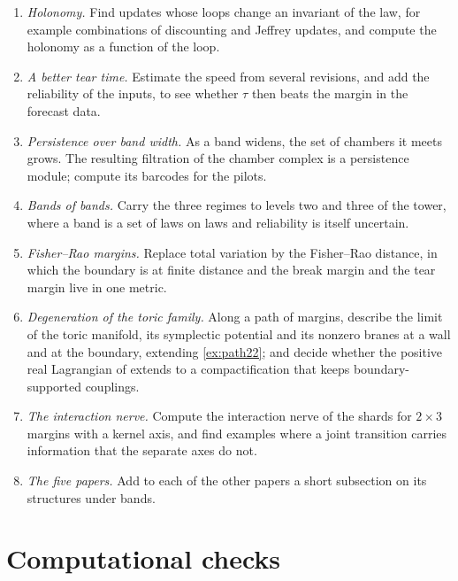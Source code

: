 \documentclass[11pt]{article}
\theoremstyle{definition}
\theoremstyle{remark}
\begin{document}
\begin{enumerate}[leftmargin=*]
\item \emph{Holonomy.} Find updates whose loops change an invariant of the law, for example combinations of discounting and Jeffrey
  updates, and compute the holonomy as a function of the loop.
\item \emph{A better tear time.} Estimate the speed from several revisions, and add the reliability of the inputs, to see whether
  $\tau$ then beats the margin in the forecast data.
\item \emph{Persistence over band width.} As a band widens, the set of chambers it meets grows. The resulting filtration of the chamber
  complex is a persistence module; compute its barcodes for the pilots.
\item \emph{Bands of bands.} Carry the three regimes to levels two and three of the tower, where a band is a set of laws on laws and
  reliability is itself uncertain.
\item \emph{Fisher--Rao margins.} Replace total variation by the Fisher--Rao distance, in which the boundary is at finite distance and
  the break margin and the tear margin live in one metric.
\item \emph{Degeneration of the toric family.} Along a path of margins, describe the limit of the toric manifold, its symplectic potential
  and its nonzero branes at a wall and at the boundary, extending \cref{ex:path22}; and decide whether the positive real Lagrangian of
  \cite{Bridges} extends to a compactification that keeps boundary-supported couplings.
\item \emph{The interaction nerve.} Compute the interaction nerve of the shards for $2\times3$ margins with a kernel axis, and find
  examples where a joint transition carries information that the separate axes do not.
\item \emph{The five papers.} Add to each of the other papers a short subsection on its structures under bands.
\end{enumerate}

\section{Computational checks}\label{sec:code}
\end{document}
